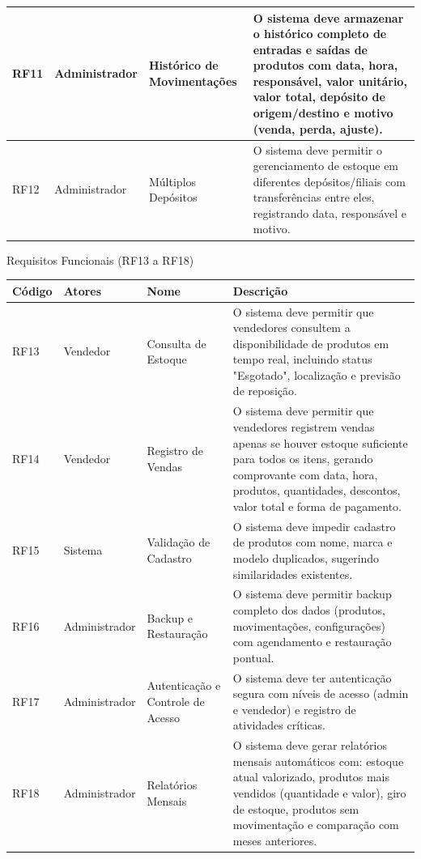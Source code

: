 \documentclass[
	12pt,				%
	openany,			%
	twoside,			%
	a4paper,			%
	english,			%
	brazil				%
	]{abntex2}
\begin{document}
\begin{quadro}[htb]
\begin{tabular}{|p{1.0cm}|p{2.8cm}|p{4.2cm}|p{7.0cm}|}
    RF11 & Administrador & Histórico de Movimentações & O sistema deve armazenar o histórico completo de entradas e saídas de produtos com data, hora, responsável, valor unitário, valor total, depósito de origem/destino e motivo (venda, perda, ajuste). \\ \hline

    RF12 & Administrador & Múltiplos Depósitos & O sistema deve permitir o gerenciamento de estoque em diferentes depósitos/filiais com transferências entre eles, registrando data, responsável e motivo. \\ \hline

    

\end{tabular}
\end{quadro}

\FloatBarrier

\begin{quadro}[htb]
\caption{\label{quadro_rf3}Requisitos Funcionais (RF13 a RF18)}
\begin{tabular}{|p{1.0cm}|p{2.8cm}|p{4.2cm}|p{7.0cm}|}
    \hline
    \textbf{Código} & \textbf{Atores} & \textbf{Nome} & \textbf{Descrição} \\ \hline

    RF13 & Vendedor & Consulta de Estoque & O sistema deve permitir que vendedores consultem a disponibilidade de produtos em tempo real, incluindo status "Esgotado", localização e previsão de reposição. \\ \hline

    RF14 & Vendedor & Registro de Vendas & O sistema deve permitir que vendedores registrem vendas apenas se houver estoque suficiente para todos os itens, gerando comprovante com data, hora, produtos, quantidades, descontos, valor total e forma de pagamento. \\ \hline

    RF15 & Sistema & Validação de Cadastro & O sistema deve impedir cadastro de produtos com nome, marca e modelo duplicados, sugerindo similaridades existentes. \\ \hline

    RF16 & Administrador & Backup e Restauração & O sistema deve permitir backup completo dos dados (produtos, movimentações, configurações) com agendamento e restauração pontual. \\ \hline

    RF17 & Administrador & Autenticação e Controle de Acesso & O sistema deve ter autenticação segura com níveis de acesso (admin e vendedor) e registro de atividades críticas. \\ \hline

    RF18 & Administrador & Relatórios Mensais & O sistema deve gerar relatórios mensais automáticos com: estoque atual valorizado, produtos mais vendidos (quantidade e valor), giro de estoque, produtos sem movimentação e comparação com meses anteriores. \\ \hline

  

\end{tabular}
\end{quadro}
\end{document}
